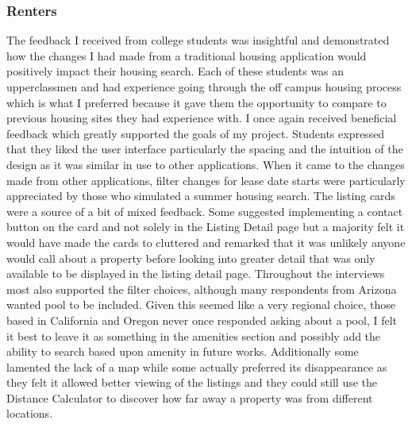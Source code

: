 \documentclass[10pt,twocolumn]{article}
\begin{document}
\subsubsection{Renters}
The feedback I received from college students was insightful and demonstrated how the changes I had made from a traditional housing application would positively impact their housing search. Each of these students was an upperclassmen and had experience going through the off campus housing process which is what I preferred because it gave them the opportunity to compare to previous housing sites they had experience with. I once again received beneficial feedback which greatly supported the goals of my project. Students expressed that they liked the user interface particularly the spacing and the intuition of the design as it was similar in use to other applications. When it came to the changes made from other applications, filter changes for lease date starts were particularly appreciated by those who simulated a summer housing search. The listing cards were a source of a bit of mixed feedback. Some suggested implementing a contact button on the card and not solely in the Listing Detail page but a majority felt it would have made the cards to cluttered and remarked that it was unlikely anyone would call about a property before looking into greater detail that was only available to be displayed in the listing detail page. Throughout the interviews most also supported  the filter choices, although many respondents from Arizona wanted pool to be included. Given this seemed like a very regional choice, those based in California and Oregon never once responded asking about a pool, I felt it best to leave it as something in the amenities section and possibly add the ability to search based upon amenity in future works. Additionally some lamented the lack of a map while some actually preferred its disappearance as they felt it allowed better viewing of the listings and they could still use the Distance Calculator to discover how far away a property was from different locations.  
\end{document}
